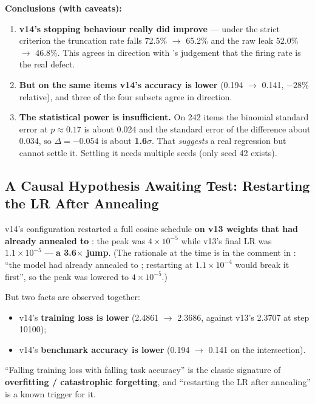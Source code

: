 \documentclass[11pt,openany]{article}
\begin{document}
\textbf{Conclusions (with caveats):}

\begin{enumerate}
\item \textbf{v14's stopping behaviour really did improve} --- under the strict criterion the
      truncation rate falls 72.5\% $\rightarrow$ 65.2\% and the raw leak 52.0\% $\rightarrow$
      46.8\%. This agrees in direction with 's judgement that the firing rate is
      the real defect.
\item \textbf{But on the same items v14's accuracy is lower} (0.194 $\rightarrow$ 0.141, $-28\%$
      relative), and three of the four subsets agree in direction.
\item \textbf{The statistical power is insufficient.} On 242 items the binomial standard error
      at $p \approx 0.17$ is about 0.024 and the standard error of the difference about 0.034,
      so $\Delta = -0.054$ is about \textbf{1.6$\sigma$}. That \emph{suggests} a real
      regression but cannot settle it. Settling it needs multiple seeds (only seed 42 exists).
\end{enumerate}

\subsection{A Causal Hypothesis Awaiting Test: Restarting the LR After Annealing}
\label{sec:en-eval-hypothesis}

v14's configuration restarted a full cosine schedule \textbf{on v13 weights that had already
annealed to }: the peak was $4\times10^{-5}$ while v13's final LR was
$1.1\times10^{-5}$ --- \textbf{a 3.6$\times$ jump}. (The rationale at the time is in the
comment in : ``the model had already annealed to
; restarting at $1.1\times10^{-4}$ would break it first'', so the peak was
lowered to $4\times10^{-5}$.)

But two facts are observed together:

\begin{itemize}
\item v14's \textbf{training loss is lower} (2.4861 $\rightarrow$ 2.3686, against v13's 2.3707
      at step 10100);
\item v14's \textbf{benchmark accuracy is lower} (0.194 $\rightarrow$ 0.141 on the
      intersection).
\end{itemize}

``Falling training loss with falling task accuracy'' is the classic signature of
\textbf{overfitting / catastrophic forgetting}, and ``restarting the LR after annealing'' is a
known trigger for it.
\end{document}
